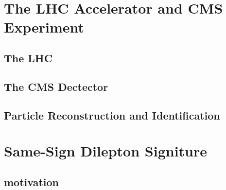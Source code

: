 
\chapter{The LHC Accelerator and CMS Experiment} \label {ch:dectector}
\section{The LHC}
\section{The CMS Dectector}
\section{Particle Reconstruction and Identification}

\chapter{Same-Sign Dilepton Signiture}
\section{motivation}
